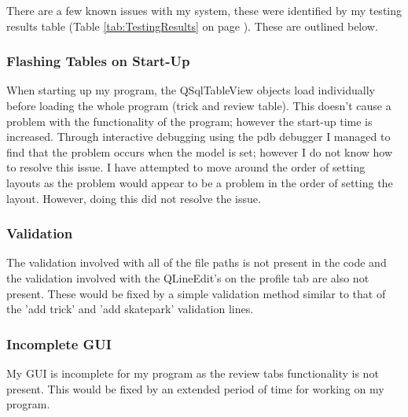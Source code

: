 There are a few known issues with my system, these were identified by my testing results table (Table \ref{tab:TestingResults} on page \pageref{tab:TestingResults}). These are outlined below.

\subsubsection{Flashing Tables on Start-Up}

When starting up my program, the QSqlTableView objects load individually before loading the whole program (trick and review table). This doesn't cause a problem with the functionality of the program; however the start-up time is increased. Through interactive debugging using the pdb debugger I managed to find that the problem occurs when the model is set; however I do not know how to resolve this issue. I have attempted to move around the order of setting layouts as the problem would appear to be a problem in the order of setting the layout. However, doing this did not resolve the issue.

\subsubsection{Validation}

The validation involved with all of the file paths is not present in the code and the validation involved with the QLineEdit's on the profile tab are also not present. These would be fixed by a simple validation method similar to that of the 'add trick' and 'add skatepark' validation lines.

\subsubsection{Incomplete GUI}

My GUI is incomplete for my program as the review tabs functionality is not present. This would be fixed by an extended period of time for working on my program.








